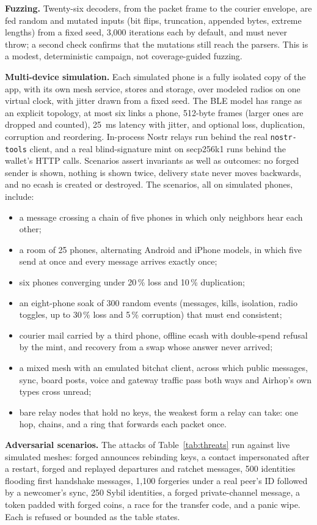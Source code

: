 \documentclass[conference]{IEEEtran}
\newcommand{\code}[1]{\texttt{#1}}
\begin{document}
\textbf{Fuzzing.} Twenty-six decoders, from the packet frame to the courier envelope, are fed random and mutated inputs (bit flips, truncation, appended bytes, extreme lengths) from a fixed seed, 3,000 iterations each by default, and must never throw; a second check confirms that the mutations still reach the parsers. This is a modest, deterministic campaign, not coverage-guided fuzzing.

\textbf{Multi-device simulation.} Each simulated phone is a fully isolated copy of the app, with its own mesh service, stores and storage, over modeled radios on one virtual clock, with jitter drawn from a fixed seed. The BLE model has range as an explicit topology, at most six links a phone, 512-byte frames (larger ones are dropped and counted), 25~ms latency with jitter, and optional loss, duplication, corruption and reordering. In-process Nostr relays run behind the real \code{nostr-tools} client, and a real blind-signature mint on secp256k1 runs behind the wallet's HTTP calls. Scenarios assert invariants as well as outcomes: no forged sender is shown, nothing is shown twice, delivery state never moves backwards, and no ecash is created or destroyed. The scenarios, all on simulated phones, include:
\begin{itemize}
\item a message crossing a chain of five phones in which only neighbors hear each other;
\item a room of 25 phones, alternating Android and iPhone models, in which five send at once and every message arrives exactly once;
\item six phones converging under 20\,\% loss and 10\,\% duplication;
\item an eight-phone soak of 300 random events (messages, kills, isolation, radio toggles, up to 30\,\% loss and 5\,\% corruption) that must end consistent;
\item courier mail carried by a third phone, offline ecash with double-spend refusal by the mint, and recovery from a swap whose answer never arrived;
\item a mixed mesh with an emulated bitchat client, across which public messages, sync, board posts, voice and gateway traffic pass both ways and Airhop's own types cross unread;
\item bare relay nodes that hold no keys, the weakest form a relay can take: one hop, chains, and a ring that forwards each packet once.
\end{itemize}

\textbf{Adversarial scenarios.} The attacks of Table~\ref{tab:threats} run against live simulated meshes: forged announces rebinding keys, a contact impersonated after a restart, forged and replayed departures and ratchet messages, 500 identities flooding first handshake messages, 1,100 forgeries under a real peer's ID followed by a newcomer's sync, 250 Sybil identities, a forged private-channel message, a token padded with forged coins, a race for the transfer code, and a panic wipe. Each is refused or bounded as the table states.
\end{document}
